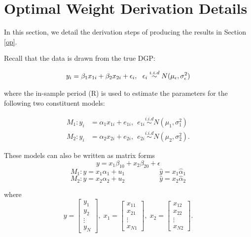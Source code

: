 \documentclass{monashthesis}
\begin{document}
\hypertarget{optimal-weight-derivation-details}{%
\section{Optimal Weight Derivation Details}\label{optimal-weight-derivation-details}}

In this section, we detail the derivation steps of producing the results in Section \ref{op}.

Recall that the data is drawn from the true DGP:

\begin{equation*}
y_i = \beta_1 x_{1i} + \beta_2 x_{2i} + \epsilon_i, \ \ \epsilon_i \stackrel{i.i.d}{\sim} N(\mu_{\epsilon},\sigma^2_{\epsilon}) \\
\end{equation*}

where the in-sample period (R) is used to estimate the parameters for the following two constituent models:

\begin{align*}
M_1: y_i &= \alpha_1 x_{1i} + e_{1i}, \ \ e_{1i} \stackrel{i.i.d}{\sim} N(\mu_{1},\sigma^2_1) \\
M_2: y_i &= \alpha_2 x_{2i} + e_{2i}, \ \ e_{2i} \stackrel{i.i.d}{\sim} N(\mu_{2},\sigma^2_2).
\end{align*}

These models can also be written as matrix forms
\[y = x_1 \beta_{10} + x_2 \beta_{20} + \epsilon\]
\[ M_1 : y = x_1 \alpha_{1} + u_1 \hspace{5em} \hat y = x_1 \hat\alpha_1\]
\[ M_2 : y = x_2 \alpha_{2} + u_2 \hspace{5em} \hat y = x_2 \hat\alpha_2 \]

where
\[
     {y}=\begin{bmatrix}
           y_{1} \\
           y_{2} \\
           \vdots \\
           y_{N}
         \end{bmatrix},\;
     {x_1}=\begin{bmatrix}
           x_{11} \\
           x_{21} \\
           \vdots \\
           x_{N1}
         \end{bmatrix},\;
    {x_2}=\begin{bmatrix}
           x_{12} \\
           x_{22} \\
           \vdots \\
           x_{N2}
         \end{bmatrix}.
\]
\end{document}
